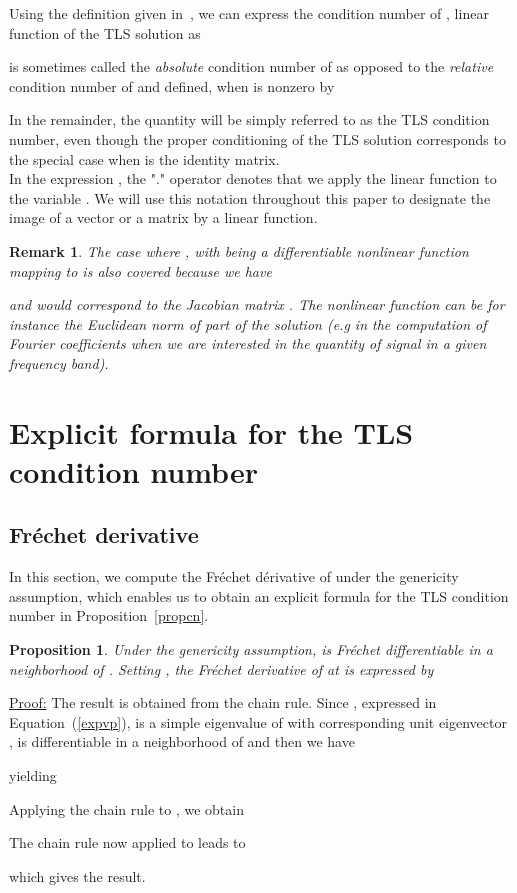 \documentclass[a4paper]{article}
\newcommand{\finproof}{\begin{flushright}  \end{flushright}}
\newtheorem{propos}{Proposition}
\newtheorem{Remark}{Remark}
\begin{document}
Using the definition given in~\cite{geur82,rice.66},
we can express the condition number
of , linear function of the TLS solution as


 is sometimes called the {\it absolute} condition number of  as opposed to the {\it relative} condition number of  and defined, when  is nonzero by


In the remainder, the quantity  will be simply referred to as the TLS condition number,
even though the proper conditioning of the TLS solution
corresponds to the special case when  is the identity matrix.\\
In the expression , the "." operator denotes that we apply the linear function  to the
variable . We will use this notation throughout this paper to designate the image of a vector or a matrix by a linear function.
\begin{Remark}
{\rm
The case where , with  being a
differentiable nonlinear function mapping  to 
is also covered because we have

and  would correspond to the Jacobian matrix .
The nonlinear function  can be for instance the Euclidean norm of part of the solution
(e.g in the computation of Fourier coefficients when we are interested in the quantity of signal in a given frequency band).
}
\end{Remark}
\section{Explicit formula for the TLS condition number}
\subsection{Fr\'echet derivative}
In this section, we compute the Fr\'echet d\'erivative of  under
the genericity assumption, which enables us to obtain an explicit formula for the TLS condition number
in Proposition~\ref{propcn}.
\begin{propos}
\label{prop:der}
Under the genericity assumption,   is Fr\'echet differentiable
in a neighborhood of . Setting ,
the Fr\'echet derivative
of  at  is expressed by

\end{propos}
{
\underline{Proof:}
The result is obtained from the chain rule.
Since , expressed in Equation~(\ref{expvp}), is a simple eigenvalue
of  with corresponding unit
eigenvector ,
 is differentiable in a neighborhood of  and then we have

yielding


Applying the chain rule to , we obtain


The chain rule now applied to  leads to

which gives the result.
\finproof
}
\end{document}
